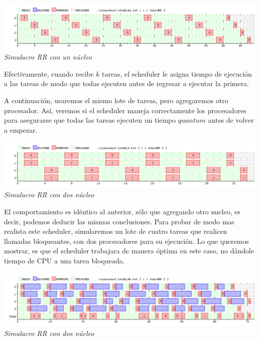 \vspace{\baselineskip}
\begin{center}
\includegraphics[scale=0.45]{../tp1/Test/resEj4Co1SB.png}
\\
\vspace{1pt}
\footnotesize\textit{Simulacro RR con un n\'ucleo}
\end{center}
\vspace{\baselineskip}

Efectivamente, cuando recibe $k$ tareas, el scheduler le asigna tiempo de ejecuci\'on a las tareas de modo que todas 
ejecuten antes de regresar a ejecutar la primera. 

A continuaci\'on, usaremos el mismo lote de tareas, pero agregaremos otro procesador. As\'i, veremos si el scheduler maneja correctamente 
los procesadores para asegurarse que todas las tareas ejecuten un tiempo $quantum$ antes de volver a empezar.

\vspace{\baselineskip}
\begin{center}
\includegraphics[scale=0.45]{../tp1/Test/resEj4Co2SB.png}
\\
\vspace{1pt}
\footnotesize\textit{Simulacro RR con dos n\'ucleo}
\end{center}
\vspace{\baselineskip}

El comportamiento es id\'entico al anterior, s\'olo que agregando otro nucleo, es decir, podemos deducir las mismas conclusiones. Para probar de 
modo mas realista este scheduler, simularemos un lote de cuatro tareas que realicen llamadas bloqueantes, con dos procesadores para su ejecuci\'on.
Lo que queremos mostrar, es que el scheduler trabajara de manera \'optima en este caso, no d\'andole tiempo de CPU a una tarea bloqueada.

\vspace{\baselineskip}
\begin{center}
\includegraphics[scale=0.45]{../tp1/Test/resEj4Co2CB.png}
\\
\vspace{1pt}
\footnotesize\textit{Simulacro RR con dos n\'ucleo}
\end{center}
\vspace{\baselineskip}

